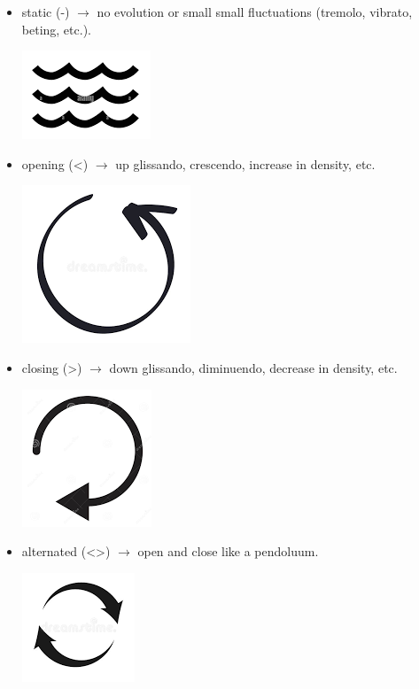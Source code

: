 \begin{enumerate}
  \begin{itemize}
  \item static (-) \(\rightarrow\) no evolution or small small fluctuations (tremolo, vibrato, beting, etc.).
    \begin{center}
    \includegraphics[scale=0.2]{../img/static.png}
    \end{center}
  \item opening (\textless) \(\rightarrow\) up glissando, crescendo, increase in density, etc.
    \begin{center}
    \includegraphics[scale=0.1]{../img/open.png}
    \end{center}
  \item closing (\textgreater) \(\rightarrow\) down glissando, diminuendo, decrease in density, etc.
    \begin{center}
    \includegraphics[scale=0.15]{../img/close.png}
    \end{center}
  \item alternated (\textless\textgreater) \(\rightarrow\) open and close like a pendoluum.
    \begin{center}
    \includegraphics[scale=0.22]{../img/alternate.png}

\end{center}
\end{itemize}
\end{enumerate}
